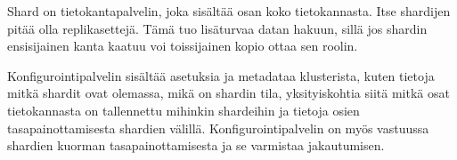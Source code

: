 Shard on tietokantapalvelin, joka sisältää osan koko tietokannasta.
Itse shardijen pitää olla replikasettejä.
Tämä tuo lisäturvaa datan hakuun, sillä jos shardin ensisijainen kanta kaatuu voi toissijainen kopio ottaa sen roolin. 
\medskip



Konfigurointipalvelin sisältää asetuksia ja metadataa klusterista,
kuten tietoja mitkä shardit ovat olemassa, mikä on shardin tila,
yksityiskohtia siitä mitkä osat tietokannasta on tallennettu mihinkin shardeihin
ja tietoja osien tasapainottamisesta shardien välillä.
Konfigurointipalvelin on myös vastuussa shardien kuorman tasapainottamisesta ja se varmistaa jakautumisen.








